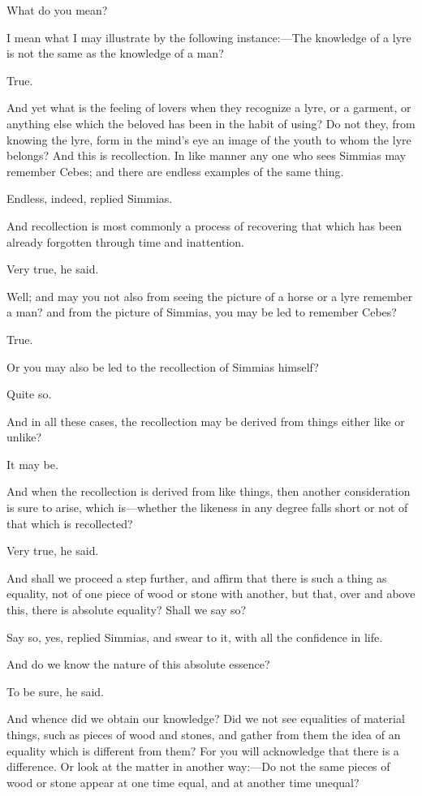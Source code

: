 What do you mean?

I mean what I may illustrate by the following instance:—The
knowledge of a lyre is not the same as the knowledge of a man?

True.

And yet what is the feeling of lovers when they recognize a lyre, or a
garment, or anything else which the beloved has been in the habit of
using? Do not they, from knowing the lyre, form in the mind's eye an image
of the youth to whom the lyre belongs? And this is recollection. In like
manner any one who sees Simmias may remember Cebes; and there are endless
examples of the same thing.

Endless, indeed, replied Simmias.

And recollection is most commonly a process of recovering that which has
been already forgotten through time and inattention.

Very true, he said.

Well; and may you not also from seeing the picture of a horse or a lyre
remember a man? and from the picture of Simmias, you may be led to
remember Cebes?

True.

Or you may also be led to the recollection of Simmias himself?

Quite so.

And in all these cases, the recollection may be derived from things either
like or unlike?

It may be.

And when the recollection is derived from like things, then another
consideration is sure to arise, which is—whether the likeness in any
degree falls short or not of that which is recollected?

Very true, he said.

And shall we proceed a step further, and affirm that there is such a thing
as equality, not of one piece of wood or stone with another, but that,
over and above this, there is absolute equality? Shall we say so?

Say so, yes, replied Simmias, and swear to it, with all the confidence in
life.

And do we know the nature of this absolute essence?

To be sure, he said.

And whence did we obtain our knowledge? Did we not see equalities of
material things, such as pieces of wood and stones, and gather from them
the idea of an equality which is different from them? For you will
acknowledge that there is a difference. Or look at the matter in another
way:—Do not the same pieces of wood or stone appear at one time
equal, and at another time unequal?

